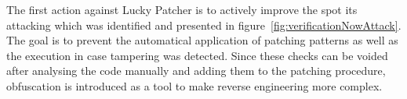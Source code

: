 The first action against Lucky Patcher is to actively improve the spot its attacking which was identified and presented in figure~\ref{fig:verificationNowAttack}.
The goal is to prevent the automatical application of patching patterns as well as the execution in case tampering was detected.
Since these checks can be voided after analysing the code manually and adding them to the patching procedure, obfuscation is introduced as a tool to make reverse engineering more complex.
